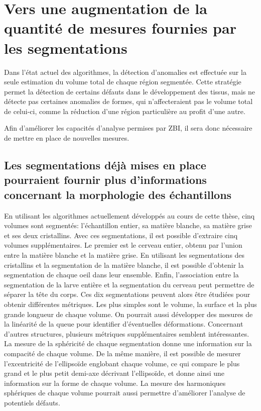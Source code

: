 \documentclass[\main/main.tex]{subfiles}
\begin{document}
                 
\section{Vers une augmentation de la quantité de mesures fournies par les segmentations}   
%
Dans l'état actuel des algorithmes, la détection d'anomalies est effectuée sur la seule estimation du volume total de chaque région segmentée. Cette stratégie permet la détection de certains défauts dans le développement des tissus, mais ne détecte pas certaines anomalies de formes, qui n'affecteraient pas le volume total de celui-ci, comme la réduction d'une région particulière au profit d'une autre.

Afin d'améliorer les capacités d'analyse permises par ZBI, il sera donc nécessaire de mettre en place de nouvelles mesures.

    \subsection{Les segmentations déjà mises en place pourraient fournir plus d'informations concernant la morphologie des échantillons}

%
En utilisant les algorithmes actuellement développés au cours de cette thèse,
cinq volumes sont segmentés: l'échantillon entier, sa matière blanche, sa matière grise et ses deux cristallins. Avec ces segmentations, il est possible d'extraire cinq volumes supplémentaires.  Le premier est le cerveau entier, obtenu par l'union entre la matière blanche et la matière grise. 
%
En utilisant les segmentations des cristallins et la segmentation de la matière blanche, il est possible d'obtenir la segmentation de chaque oeil dans leur ensemble.
%
Enfin, l'association entre la segmentation de la larve entière et la segmentation du cerveau peut permettre de séparer la tête du corps.
%
Ces dix segmentations peuvent alors être étudiées pour obtenir différentes métriques. Les plus simples sont le volume, la surface et la plus grande longueur de chaque volume. On pourrait aussi développer des mesures de la linéarité de la queue pour identifier d'éventuelles déformations.
%
Concernant d'autres structures, plusieurs métriques supplémentaires semblent intéressantes.
%
La mesure de la sphéricité de chaque segmentation donne une information sur la compacité de chaque volume.
%
De la même manière, il est possible de mesurer l'excentricité de l'ellipsoïde englobant chaque volume, ce qui compare le plus grand et le plus petit demi-axe décrivant l'ellipsoïde, et donne ainsi une information sur la forme de chaque volume.
%
La mesure des harmoniques sphériques de chaque volume pourrait aussi permettre d'améliorer l'analyse de potentiels défauts.
\end{document}
